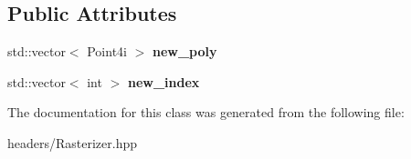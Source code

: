 \subsection*{Public Attributes}
\begin{DoxyCompactItemize}
\item 
\mbox{\label{class_project1__3_d_a_1_1_rasterizer_a0e4e631247f96184380d58211aad933e}} 
std\+::vector$<$ Point4i $>$ {\bfseries new\+\_\+poly}
\item 
\mbox{\label{class_project1__3_d_a_1_1_rasterizer_a5ba261ff66c2bf2e6e73235e7c7f8be0}} 
std\+::vector$<$ int $>$ {\bfseries new\+\_\+index}
\end{DoxyCompactItemize}


The documentation for this class was generated from the following file\+:\begin{DoxyCompactItemize}
\item 
headers/Rasterizer.\+hpp\end{DoxyCompactItemize}

